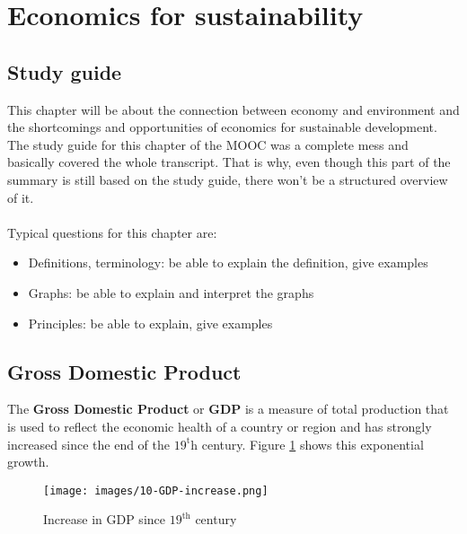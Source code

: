 \documentclass[../summary.tex]{subfiles}
\begin{document}
\section{Economics for sustainability}

\subsection{Study guide}

This chapter will be about the connection between economy and environment and the shortcomings and opportunities of economics for sustainable development. The study guide for this chapter of the MOOC was a complete mess and basically covered the whole transcript. That is why, even though this part of the summary is still based on the study guide, there won't be a structured overview of it.
\\\\
Typical questions for this chapter are:
\begin{itemize}
	\item Definitions, terminology: be able to explain the definition, give examples
	\item Graphs: be able to explain and interpret the graphs
	\item Principles: be able to explain, give examples
\end{itemize}

\subsection{Gross Domestic Product}
\label{sec:10-gdp}

The \textbf{Gross Domestic Product} or \textbf{GDP} is a measure of total production that is used to reflect the economic health of a country or region and has strongly increased since the end of the $\mathrm{19^th}$ century. Figure \ref{fig:GDP} shows this exponential growth.

\begin{figure}[htbp]
	\centering
	\texttt{[image: images/10-GDP-increase.png]}
	\caption{Increase in GDP since $\mathrm{19^{th}}$ century}
	\label{fig:GDP}
\end{figure}
\end{document}
